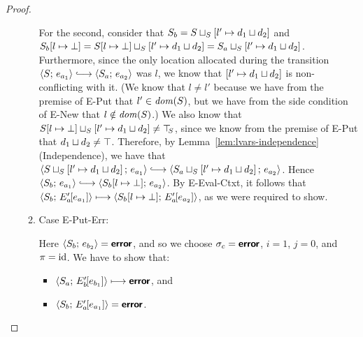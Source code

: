 \begin{proof}
\begin{enumerate}
\begin{enumerate}
      For the second, consider that $S_b =
      S \sqcup_{S} \left[ l' \mapsto d_1 \sqcup d_2 \right]$
      and $S_b[l \mapsto \bot] =
      S[l \mapsto \bot] \sqcup_{S} \left[ l' \mapsto d_1 \sqcup d_2 \right]
      =
      S_a \sqcup_{S} \left[ l' \mapsto d_1 \sqcup d_2 \right]$.
      Furthermore, since the only location allocated during the
      transition $\config{S}{e_{a_1}} \parstepsto
      \config{S_a}{e_{a_2}}$ was $l$, we know that
      $\left[ l' \mapsto d_1 \sqcup d_2 \right]$ is
      non-conflicting with it.  (We know that $l \neq l'$ because we
      have from the premise of {\sc E-Put} that $l' \in \mathit{dom}(S)$, but
      we have from the side condition of {\sc E-New} that $l \notin
      \mathit{dom}(S)$.)  We also know that
      $S[l \mapsto \bot] \sqcup_{S} \left[ l' \mapsto d_1 \sqcup d_2 \right]
      \neq \top\hspace{-0.85mm}_{S}$, since we know from the premise of {\sc E-Put} that
      $d_1 \sqcup d_2 \neq \top$.  Therefore, by
      Lemma~\ref{lem:lvars-independence} (Independence), we have that
      $\config{\lubstore{S}{\store{\storebindingRaw{l'}{\userlub{d_1}{d_2}}}}}{e_{a_1}}
      \parstepsto
      \config{\lubstore{S_a}{\store{\storebindingRaw{l'}{\userlub{d_1}{d_2}}}}}{e_{a_2}}$.
      Hence $\config{S_b}{e_{a_1}} \parstepsto
      \config{\extSRaw{S_b}{l}{\bot}}{e_{a_2}}$.  By {\sc
        E-Eval-Ctxt}, it follows that
      $\langle S_b;\, E'_a\hspace{-1mm}\left[e_{a_1}\right] \rangle \longmapsto
      \langle S_b[l \mapsto \bot];\, E'_a\hspace{-1mm}\left[e_{a_2}\right] \rangle$, as
      we were required to show.

    \item Case {\sc E-Put-Err}:

      Here $\langle S_b;\, e_{b_2} \rangle = \textbf{\textsf{error}}$, and so we choose $\sigma_c
      = \textbf{\textsf{error}}$, $i = 1$, $j = 0$, and $\pi = \mathrm{id}$.  We have to show
      that:
      \begin{itemize}
      \item $\langle S_a;\, E'_b\hspace{-1mm}\left[e_{b_1}\right] \rangle \longmapsto
        \textbf{\textsf{error}}$, and
      \item
        $\langle S_b;\, E'_a\hspace{-1mm}\left[e_{a_1}\right] \rangle = \textbf{\textsf{error}}$.
      \end{itemize}


\end{enumerate}
\end{enumerate}
\end{proof}
